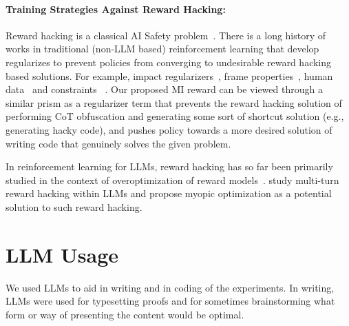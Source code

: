 \documentclass{article}
\theoremstyle{plain}
\begin{document}
\paragraph{Training Strategies Against Reward Hacking:}
Reward hacking is a classical AI Safety problem~\citep{skalse2022defining}.
There is a long history of works in traditional (non-LLM based) reinforcement learning that develop regularizes to prevent policies from converging to undesirable reward hacking based solutions. 
For example, impact regularizers~\citep{armstrong2017low,turner2020avoiding}, frame properties~\citep{shah2019preferences}, human data~\citep{carroll2019utility} and constraints ~\citep{pmlr-v139-malik21a}.
Our proposed MI reward can be viewed through a similar prism as a regularizer term that prevents the reward hacking solution of performing CoT obfuscation and generating some sort of shortcut solution (e.g., generating hacky code), and pushes policy towards a more desired solution of writing code that genuinely solves the given problem.

In reinforcement learning for LLMs, reward hacking has so far been primarily studied in the context of overoptimization of reward models~\citep{gao2023scaling,coste2023reward,miao2024inform}.
\citet{farquhar2025monamyopicoptimizationnonmyopic} study multi-turn reward hacking within LLMs and propose myopic optimization as a potential solution to such reward hacking.


\section{LLM Usage}
We used LLMs to aid in writing and in coding of the experiments.
In writing, LLMs were used for typesetting proofs and for sometimes brainstorming what form or way of presenting the content would be optimal.
\end{document}
